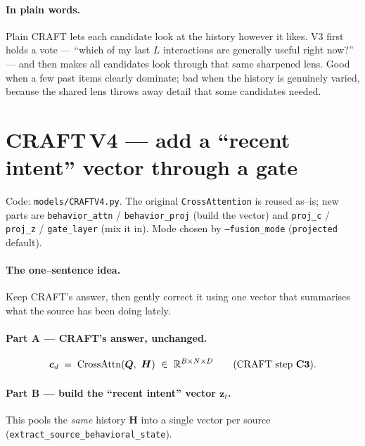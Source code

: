 \documentclass[11pt]{article}
\newcommand{\R}{\mathbb{R}}
\newcommand{\code}[1]{\texttt{\small #1}}
\newcommand{\CA}{\mathrm{CrossAttn}}
\begin{document}
\paragraph{In plain words.}
Plain CRAFT lets each candidate look at the history however it likes. V3 first
holds a vote --- ``which of my last $L$ interactions are generally useful right
now?'' --- and then makes all candidates look through that same sharpened lens.
Good when a few past items clearly dominate; bad when the history is genuinely
varied, because the shared lens throws away detail that some candidates needed.

\section{CRAFT\,V4 --- add a ``recent intent'' vector through a gate}
\label{sec:v4}

Code: \code{models/CRAFTV4.py}. The original \code{CrossAttention} is reused
as--is; new parts are \code{behavior\_attn} / \code{behavior\_proj} (build the
vector) and \code{proj\_c} / \code{proj\_z} / \code{gate\_layer} (mix it in).
Mode chosen by \code{--fusion\_mode} (\code{projected} default).

\paragraph{The one--sentence idea.}
Keep CRAFT's answer, then gently correct it using one vector that summarises
what the source has been doing lately.

\paragraph{Part A --- CRAFT's answer, unchanged.}
\[
  \bm{c}_d \;=\; \CA(\bm{Q},\ \bm{H})\ \in\ \R^{B\times N\times D}
  \qquad\text{(CRAFT step \textbf{C3}).}
\]

\paragraph{Part B --- build the ``recent intent'' vector $\bm{z}_t$.}
This pools the \emph{same} history $\bm{H}$ into a single vector per source
(\code{extract\_source\_behavioral\_state}).
\end{document}
